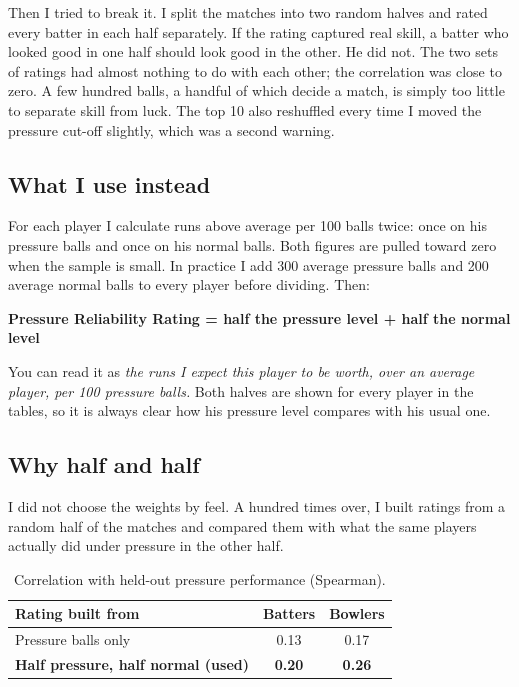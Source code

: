 \documentclass[10.5pt,a4paper]{article}
\begin{document}
Then I tried to break it. I split the matches into two random halves and rated every batter in each half separately. If the rating captured real skill, a batter who looked good in one half should look good in the other. He did not. The two sets of ratings had almost nothing to do with each other; the correlation was close to zero. A few hundred balls, a handful of which decide a match, is simply too little to separate skill from luck. The top 10 also reshuffled every time I moved the pressure cut-off slightly, which was a second warning.

\subsection{What I use instead}

For each player I calculate runs above average per 100 balls twice: once on his pressure balls and once on his normal balls. Both figures are pulled toward zero when the sample is small. In practice I add 300 average pressure balls and 200 average normal balls to every player before dividing. Then:

\begin{center}
\textbf{Pressure Reliability Rating = half the pressure level + half the normal level}
\end{center}

You can read it as \emph{the runs I expect this player to be worth, over an average player, per 100 pressure balls.} Both halves are shown for every player in the tables, so it is always clear how his pressure level compares with his usual one.

\subsection{Why half and half}

I did not choose the weights by feel. A hundred times over, I built ratings from a random half of the matches and compared them with what the same players actually did under pressure in the other half.

\begin{table}[H]\centering\small
\begin{tabular}{l c c}
\toprule
Rating built from & Batters & Bowlers\\
\midrule
Pressure balls only & 0.13 & 0.17\\
\textbf{Half pressure, half normal (used)} & \textbf{0.20} & \textbf{0.26}\\
\bottomrule
\end{tabular}
\caption*{\small Correlation with held-out pressure performance (Spearman).}
\end{table}
\end{document}
